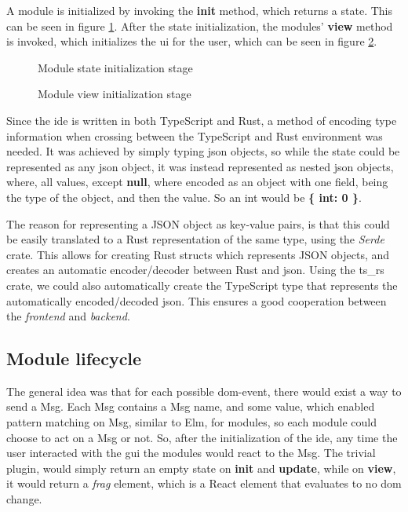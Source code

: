 A module is initialized by invoking the \textbf{init} method, which returns a
state. This can be seen in figure \ref{fig:moduleInit}. After the state
initialization, the modules' \textbf{view} method is invoked, which initializes
the \gls*{ui} for the user, which can be seen in figure \ref{fig:moduleInitView}.

\begin{figure}[H]
  \centering
  
  \caption{Module state initialization stage}
  \label{fig:moduleInit}
\end{figure}

\begin{figure}[H]
  \centering
  
  \caption{Module view initialization stage}
  \label{fig:moduleInitView}
\end{figure}

Since the \gls*{ide} is written in both TypeScript and Rust, a method of encoding
type information when crossing between the TypeScript and Rust environment was
needed. It was achieved by simply typing \gls*{json} objects, so while the state
could be represented as any \gls*{json} object, it was instead represented as
nested \gls*{json} objects, where, all values, except \textbf{null}, where
encoded as an object with one field, being the type of the object, and then the
value. So an int would be \textbf{\{ int: 0 \}}.

The reason for representing a JSON object as key-value pairs, is that this could
be easily translated to a Rust representation of the same type, using the
\textit{Serde} crate. This allows for creating Rust structs which represents
JSON objects, and creates an automatic encoder/decoder between Rust and
\gls*{json}. Using the ts\_rs crate, we could also automatically create the
TypeScript type that represents the automatically encoded/decoded \gls*{json}.
This ensures a good cooperation between the \textit{frontend} and
\textit{backend}.

\subsection{Module lifecycle}

The general idea was that for each possible \gls*{dom}-event, there would exist a
way to send a Msg. Each Msg contains a Msg name, and some value, which enabled
pattern matching on Msg, similar to Elm, for modules, so each module could
choose to act on a Msg or not. So, after the initialization of the \gls*{ide},
any time the user interacted with the \gls*{gui} the modules would react to the
Msg. The trivial plugin, would simply return an empty state on \textbf{init} and
\textbf{update}, while on \textbf{view}, it would return a \textit{frag}
element, which is a React element that evaluates to no \gls*{dom} change.

